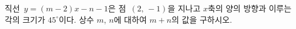 직선~$y=(m-2)x-n-1$은 점~$(2,\,-1)$을 지나고 $x$축의 양의 방향과 이루는 각의 크기가 $45^\circ$이다. 상수 $m$, $n$에 대하여 $m+n$의 값을 구하시오.

